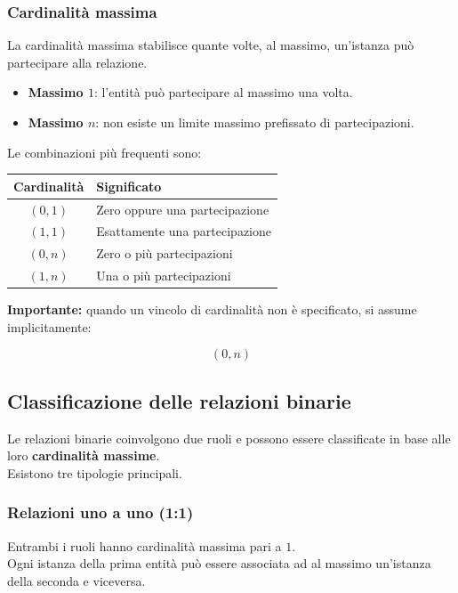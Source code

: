\subsubsection*{Cardinalità massima}

La cardinalità massima stabilisce quante volte, al massimo,
un'istanza può partecipare alla relazione.
\begin{itemize}
    \item \textbf{Massimo $1$}: l'entità può partecipare
    al massimo una volta.
    \item \textbf{Massimo $n$}: non esiste un limite massimo
    prefissato di partecipazioni.
\end{itemize}
\noindent
Le combinazioni più frequenti sono:

\begin{center}
\begin{tabular}{|c|l|}
\hline
\textbf{Cardinalità} & \textbf{Significato} \\
\hline
$(0,1)$ & Zero oppure una partecipazione \\
\hline
$(1,1)$ & Esattamente una partecipazione \\
\hline
$(0,n)$ & Zero o più partecipazioni \\
\hline
$(1,n)$ & Una o più partecipazioni \\
\hline
\end{tabular}
\end{center}

\noindent
\textbf{Importante:} quando un vincolo di cardinalità
non è specificato, si assume implicitamente:

\[
\boxed{(0,n)}
\]

\subsection*{Classificazione delle relazioni binarie}

Le relazioni binarie coinvolgono due ruoli e possono
essere classificate in base alle loro
\textbf{cardinalità massime}.\\
Esistono tre tipologie principali.

\subsubsection*{Relazioni uno a uno (1:1)}

Entrambi i ruoli hanno cardinalità massima pari a $1$.\\
Ogni istanza della prima entità può essere associata
ad al massimo un'istanza della seconda e viceversa.

